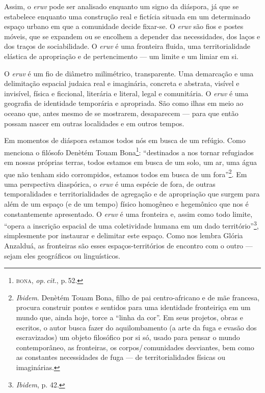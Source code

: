 Assim, o \emph{eruv} pode ser analisado enquanto um signo da diáspora,
já que se estabelece enquanto uma construção real e fictícia situada em
um determinado espaço urbano em que a comunidade decide fixar-se. O
\emph{eruv} são fios e postes móveis, que se expandem ou se encolhem a
depender das necessidades, dos laços e dos traços de sociabilidade. O
\emph{eruv} é uma fronteira fluida, uma territorialidade elástica de
apropriação e de pertencimento --- um limite e um limiar em si.

\begin{center}\end{center}

\noindent{}O \emph{eruv} é um fio de diâmetro milimétrico, transparente. Uma
demarcação e uma delimitação espacial judaica real e imaginária,
concreta e abstrata, visível e invisível, física e ficcional, literária
e literal, legal e comunitária. O \emph{eruv} é uma geografia de
identidade temporária e apropriada. São como ilhas em meio ao oceano
que, antes mesmo de se mostrarem, desaparecem --- para que então possam
nascer em outras localidades e em outros tempos.

Em momentos de diáspora estamos todos nós em busca de um refúgio. Como
menciona o filósofo Denètém Touam Bona\footnote{\textsc{bona}, \emph{op.\,cit.}, p.\,52.}:
``destinados a nos tornar refugiados em nossas próprias terras,
todos estamos em busca de um solo, um ar, uma água que não tenham sido
corrompidos, estamos todos em busca de um fora''\footnote{\emph{Ibidem}.
  Denètém Touam Bona, filho de pai centro-africano e de mãe francesa,
  procura construir pontes e sentidos para uma identidade fronteiriça em
  um mundo que, ainda hoje, torce a ``linha da cor''. Em seus
  projetos, obras e escritos, o autor busca fazer do aquilombamento (a
  arte da fuga e evasão dos escravizados) um objeto filosófico por si
  só, usado para pensar o mundo contemporâneo, as fronteiras, os
  corpos/\,comunidades desviantes, bem como as constantes necessidades de
  fuga --- de territorialidades físicas ou imaginárias.}. Em uma
perspectiva diaspórica, o \emph{eruv} é uma espécie de fora, de outras
temporalidades e territorialidades de agregação e de apropriação que
surgem para além de um espaço (e de um tempo) físico homogêneo e
hegemônico que nos é constantemente apresentado. O \emph{eruv} é uma
fronteira e, assim como todo limite, ``opera a inscrição espacial
de uma coletividade humana em um dado território''\footnote{\emph{Ibidem}, p.
  42.}, simplesmente por instaurar e delimitar este espaço. Como nos
lembra Glória Anzalduá, as fronteiras são esses espaços-territórios de
encontro com o outro --- sejam eles geográficos ou linguísticos.

